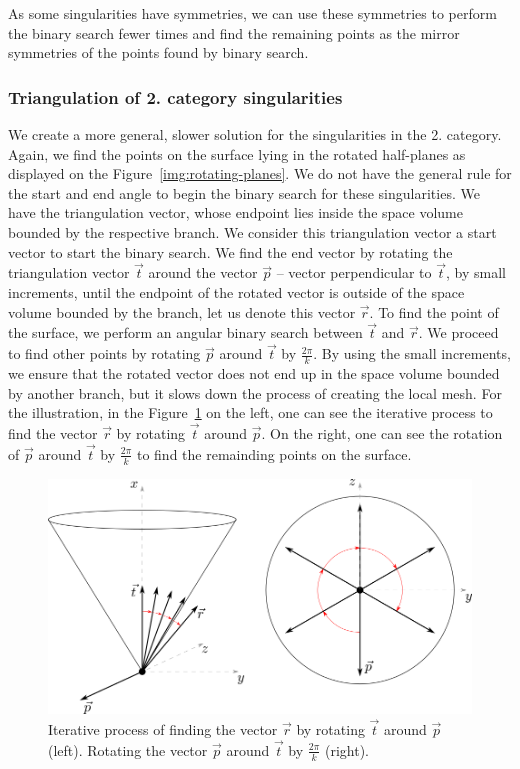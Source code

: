 As some singularities have symmetries, we can use these symmetries
to perform the binary search fewer times and find the remaining points
as the mirror symmetries of the points found by binary search.

\subsubsection*{Triangulation of 2. category singularities}
We create a more general, slower solution for the singularities in the 2. category.
Again, we find the points on the surface lying in the rotated half-planes
as displayed on the Figure~\ref{img:rotating-planes}.
We do not have the general rule for the start 
and end angle to begin the binary search for these singularities. We have the triangulation vector,
whose endpoint lies inside the space volume bounded by the respective branch.
We consider this triangulation vector a start vector to start the binary 
search. We find the end vector by rotating the triangulation vector $\vec{t}$ 
around the vector $\vec{p}$ -- vector perpendicular to $\vec{t}$, by small increments, 
until the endpoint of the rotated vector is outside of the space volume bounded by the branch,
let us denote this vector $\vec{r}$.
To find the point of the surface, we perform an angular binary search between $\vec{t}$
and $\vec{r}$. We proceed to find other points by rotating $\vec{p}$
around $\vec{t}$ by $\frac{2\pi}{k}$.
By using the small increments, we ensure that the rotated vector does not end up in
the space volume bounded by another branch, but it slows down the process of creating
the local mesh.
For the illustration, in the Figure~\ref{img:54} on the left, one can see the iterative
process to find the vector $\vec{r}$ by rotating $\vec{t}$ around $\vec{p}$.
On the right, one can see the rotation of $\vec{p}$ around $\vec{t}$ by 
$\frac{2\pi}{k}$ to find the remainding points on the surface.

\begin{figure}
    \centerline{\includegraphics[scale=0.5]{images/img54}}
    \caption[Triangulation of 2. category singularities]
    {Iterative process of finding the vector $\vec{r}$ 
    by rotating $\vec{t}$ around $\vec{p}$ (left).
    Rotating the vector $\vec{p}$ around $\vec{t}$ by 
    $\frac{2\pi}{k}$ (right).}
    \label{img:54}
\end{figure}

